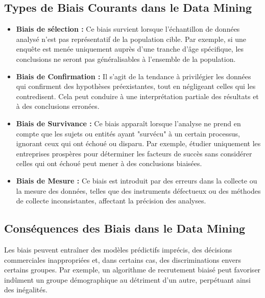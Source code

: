 \documentclass[a4paper,12pt]{report}
\begin{document}
		\subsection{Types de Biais Courants dans le Data Mining}
			\begin{itemize}
				\item \textbf{Biais de sélection :} Ce biais survient lorsque l'échantillon de données analysé n'est pas représentatif de la population cible. Par exemple, si une enquête est menée uniquement auprès d'une tranche d'âge spécifique, les conclusions ne seront pas généralisables à l'ensemble de la population.​
				\item \textbf{Biais de Confirmation :} Il s'agit de la tendance à privilégier les données qui confirment des hypothèses préexistantes, tout en négligeant celles qui les contredisent. Cela peut conduire à une interprétation partiale des résultats et à des conclusions erronées.​
				\item \textbf{Biais de Survivance :} Ce biais apparaît lorsque l'analyse ne prend en compte que les sujets ou entités ayant "survécu" à un certain processus, ignorant ceux qui ont échoué ou disparu. Par exemple, étudier uniquement les entreprises prospères pour déterminer les facteurs de succès sans considérer celles qui ont échoué peut mener à des conclusions biaisées.​
				\item \textbf{Biais de Mesure :} Ce biais est introduit par des erreurs dans la collecte ou la mesure des données, telles que des instruments défectueux ou des méthodes de collecte inconsistantes, affectant la précision des analyses.​
			\end{itemize}
			
		\subsection{Conséquences des Biais dans le Data Mining}
			Les biais peuvent entraîner des modèles prédictifs imprécis, des décisions commerciales inappropriées et, dans certains cas, des discriminations envers certains groupes. Par exemple, un algorithme de recrutement biaisé peut favoriser indûment un groupe démographique au détriment d'un autre, perpétuant ainsi des inégalités.
\end{document}
